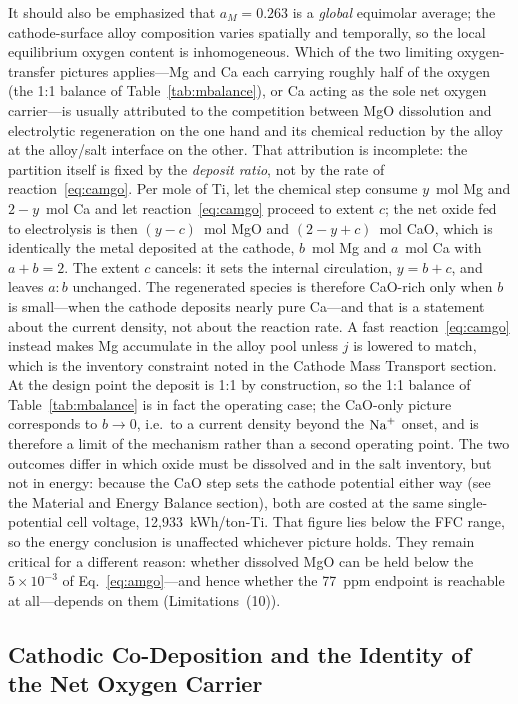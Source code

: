 \documentclass[pdflatex,sn-basic,Numbered]{sn-jnl}
\begin{document}
It should also be emphasized that $a_M = 0.263$ is a \emph{global} equimolar average; the cathode-surface alloy composition varies spatially and temporally, so the local equilibrium oxygen content is inhomogeneous. Which of the two limiting oxygen-transfer pictures applies---Mg and Ca each carrying roughly half of the oxygen (the 1:1 balance of Table~\ref{tab:mbalance}), or Ca acting as the sole net oxygen carrier---is usually attributed to the competition between MgO dissolution and electrolytic regeneration on the one hand and its chemical reduction by the alloy at the alloy/salt interface on the other. That attribution is incomplete: the partition itself is fixed by the \emph{deposit ratio}, not by the rate of reaction~\ref{eq:camgo}. Per mole of Ti, let the chemical step consume $y$~mol Mg and $2-y$~mol Ca and let reaction~\ref{eq:camgo} proceed to extent $c$; the net oxide fed to electrolysis is then $(y-c)$~mol MgO and $(2-y+c)$~mol CaO, which is identically the metal deposited at the cathode, $b$~mol Mg and $a$~mol Ca with $a+b=2$. The extent $c$ cancels: it sets the internal circulation, $y = b+c$, and leaves $a:b$ unchanged. The regenerated species is therefore CaO-rich only when $b$ is small---when the cathode deposits nearly pure Ca---and that is a statement about the current density, not about the reaction rate. A fast reaction~\ref{eq:camgo} instead makes Mg accumulate in the alloy pool unless $j$ is lowered to match, which is the inventory constraint noted in the Cathode Mass Transport section. At the design point the deposit is 1:1 by construction, so the 1:1 balance of Table~\ref{tab:mbalance} is in fact the operating case; the CaO-only picture corresponds to $b \to 0$, i.e.\ to a current density beyond the $\ce{Na+}$ onset, and is therefore a limit of the mechanism rather than a second operating point. The two outcomes differ in which oxide must be dissolved and in the salt inventory, but not in energy: because the CaO step sets the cathode potential either way (see the Material and Energy Balance section), both are costed at the same single-potential cell voltage, 12{,}933~kWh/ton-Ti. That figure lies below the FFC range, so the energy conclusion is unaffected whichever picture holds. They remain critical for a different reason: whether dissolved MgO can be held below the $5\times10^{-3}$ of Eq.~\ref{eq:amgo}---and hence whether the 77~ppm endpoint is reachable at all---depends on them (Limitations~(10)).

\subsection{Cathodic Co-Deposition and the Identity of the Net Oxygen Carrier}
\end{document}
